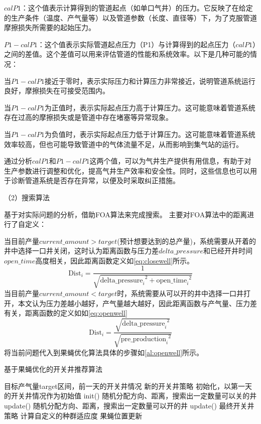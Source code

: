 $calP1$：这个值表示计算得到的管道起点（如单口气井）的压力。它反映了在给定的生产条件（温度、产气量等）以及管道参数（长度、直径等）下，为了克服管道摩擦损失所需要的起始压力。 

$P1 - calP1$：这个值表示实际管道起点压力（P1）与计算得到的起点压力（$calP1$）之间的差值。这个差值可以用来评估管道的性能和系统效率。以下是几种可能的情况：

当$P1 - calP1$接近于零时，表示实际压力和计算压力非常接近，说明管道系统运行良好，摩擦损失在可接受范围内。 

当$P1 - calP1$为正值时，表示实际起点压力高于计算压力。这可能意味着管道系统存在过高的摩擦损失或是管道中存在堵塞等异常现象。 

当$P1 - calP1$为负值时，表示实际起点压力低于计算压力。这可能意味着管道系统效率较高，但也可能导致管道中的气体流量不足，从而影响到集气站的运行。 

通过分析$calP1$和$P1 - calP1$这两个值，可以为气井生产提供有用信息，有助于对生产参数进行调整和优化，提高气井生产效率和安全性。同时，这些信息也可以用于诊断管道系统是否存在异常，以便及时采取纠正措施。

（2）搜索算法

基于对实际问题的分析，借助FOA算法来完成搜索。
主要对FOA算法中的距离进行了自定义：

当目前产量$current\_amount>target$(预计想要达到的总产量)，系统需要从开着的井中选择一口井关闭，这时认为距离函数与压力差$delta\_pressure$和已经开井时间$open\_time$高度相关，因此距离函数定义如\eqref{eq:closewell}所示。
\begin{equation}
    \text{Dist}_i = \frac{1}{\sqrt{{\text{delta\_pressure}_i}^2 + {\text{open\_time}_i}^2}}
    \label{eq:closewell}
\end{equation}
当目前产量$current\_amount<target$时，系统需要从可以开的井中选择一口井打开，本文认为压力差越小越好，产气量越大越好，因此距离函数与产气量、压力差有关，距离函数的定义如如\eqref{eq:openwell}
\begin{equation}
    \text{Dist}_i = \frac{\sqrt{{\text{delta\_pressure}_i}^2}}{\sqrt{{\text{pre\_production}_i}^2}}
    \label{eq:openwell}
\end{equation}
将当前问题代入到果蝇优化算法具体的步骤如\ref{al:openwell}所示。
\begin{algorithm}[H]
    \caption{基于果蝇优化的开关井推荐算法}
    \begin{algorithmic}[1]
       \Require 目标产气量target区间，前一天的开关井情况
       \Ensure  新的开关井策略
       \State 初始化，以第一天的开关井情况作为初始值 init()
                \State 随机分配方向、距离，搜索出一定数量可以关的井 update()
                \State 随机分配方向、距离，搜索出一定数量可以开的井 update()
            \Else
                \State \Return 最终开关井策略
            \EndIf
            \State 计算自定义的种群适应度
            \State 果蝇位置更新
        \EndWhile
    \end{algorithmic}
    \label{al:openwell}
\end{algorithm}

